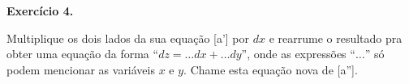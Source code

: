 \documentclass[oneside,12pt]{article}
\begin{document}
{\bf Exercício 4.}

Multiplique os dois lados da sua equação [a'] por $dx$ e rearrume o
resultado pra obter uma equação da forma ``$dz = \ldots dx + \ldots
dy$'', onde as expressões ``$\ldots$'' só podem mencionar as variáveis
$x$ e $y$. Chame esta equação nova de [a''].

















\end{document}
